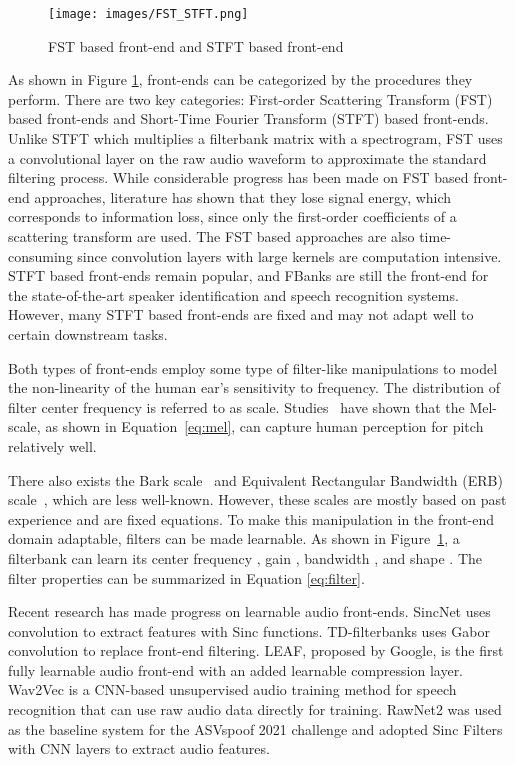 \documentclass[conference]{IEEEtran}
\begin{document}
\begin{figure}[hpbt]
\centering
\texttt{[image: images/FST\_STFT.png]}
\caption{FST based front-end and STFT based front-end}
\label{fig:fst_stft}
\end{figure}

As shown in Figure \ref{fig:fst_stft}, front-ends can be categorized by the procedures they perform. There are two key categories: First-order Scattering Transform (FST)\cite{Andn2014DeepSS} based front-ends and Short-Time Fourier Transform (STFT) based front-ends. Unlike STFT which multiplies a filterbank matrix with a spectrogram,  FST uses a convolutional layer on the raw audio waveform to approximate the standard filtering process. While considerable progress has been made on FST based front-end approaches, literature has shown that they lose signal energy, which corresponds to information loss, since only the first-order coefficients of a scattering transform are used\cite{Andn2014DeepSS}. The FST based approaches are also time-consuming\cite{Lee2018SampleCNNED} since convolution layers with large kernels are computation intensive. STFT based front-ends remain popular, and FBanks are still the front-end for the state-of-the-art speaker identification\cite{Desplanques2020ECAPATDNNEC} and speech recognition\cite{Villalba2020StateoftheartSR} systems. However, many STFT based front-ends are fixed and may not adapt well to certain downstream tasks.

Both types of front-ends employ some type of filter-like manipulations to model the non-linearity of the human ear's sensitivity to frequency. The distribution of filter center frequency is referred to as scale. Studies~\cite{Lippmann1997SpeechRB} have shown that the Mel-scale, as shown in Equation~\ref{eq:mel}, can capture human perception for pitch relatively well. 



There also exists the Bark scale~\cite{Zwicker1980AnalyticalEF} and Equivalent Rectangular Bandwidth (ERB) scale~\cite{Glasberg1990DerivationOA}, which are less well-known. However, these scales are mostly based on past experience and are fixed equations. To make this manipulation in the front-end domain adaptable, filters can be made learnable. As shown in Figure~\ref{fig:fst_stft}, a filterbank can learn its center frequency , gain , bandwidth , and shape . The filter properties can be summarized in Equation \ref{eq:filter}.



Recent research has made progress on learnable audio front-ends. SincNet\cite{Ravanelli2018SpeakerRF} uses convolution to extract features with Sinc functions. TD-filterbanks\cite{Zeghidour2018LearningFF} uses Gabor convolution to replace front-end filtering. LEAF\cite{Zeghidour2021LEAFAL}, proposed by Google, is the first fully learnable audio front-end with an added learnable compression layer. Wav2Vec\cite{Baevski2020wav2vec2A} is a CNN-based unsupervised audio training method for speech recognition that can use raw audio data directly for training. RawNet2\cite{Tak2021EndtoEndAW} was used as the baseline system for the ASVspoof 2021 challenge and adopted Sinc Filters with CNN layers to extract audio features.
\end{document}
